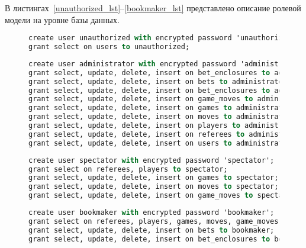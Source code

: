 В листингах~\ref{unauthorized_lst}--\ref{bookmaker_lst} представлено описание ролевой модели на уровне базы данных.

\begin{figure}[H]
	\begin{lstlisting}[label=unauthorized_lst,caption=Описание роли неаторизованного пользователя,language=Caml]
create user unauthorized with encrypted password 'unauthorized';
grant select on users to unauthorized;
	\end{lstlisting}
\end{figure}
\begin{figure}[H]
	\begin{lstlisting}[label=administrator_lst,caption=Описание роли администратора,language=Caml]
create user administrator with encrypted password 'administrator';
grant select, update, delete, insert on bet_enclosures to administrator;
grant select, update, delete, insert on bets to administrator;
grant select, update, delete, insert on bet_enclosures to administrator;
grant select, update, delete, insert on game_moves to administrator;
grant select, update, delete, insert on games to administrator;
grant select, update, delete, insert on moves to administrator;
grant select, update, delete, insert on players to administrator;
grant select, update, delete, insert on referees to administrator;
grant select, update, delete, insert on users to administrator;
	\end{lstlisting}
\end{figure}
\begin{figure}[H]
	\begin{lstlisting}[label=spectator_lst,caption=Описание роли наблюдателя,language=Caml]
create user spectator with encrypted password 'spectator';
grant select on referees, players to spectator;
grant select, update, delete, insert on games to spectator;
grant select, update, delete, insert on moves to spectator;
grant select, update, delete, insert on game_moves to spectator;
	\end{lstlisting}
\end{figure}
\begin{figure}[H]
	\begin{lstlisting}[label=bookmaker_lst,caption=Описание роли букмекера,language=Caml]
create user bookmaker with encrypted password 'bookmaker';
grant select on referees, players, games, moves, game_moves to bookmaker;
grant select, update, delete, insert on bets to bookmaker;
grant select, update, delete, insert on bet_enclosures to bookmaker;
	\end{lstlisting}
\end{figure}

